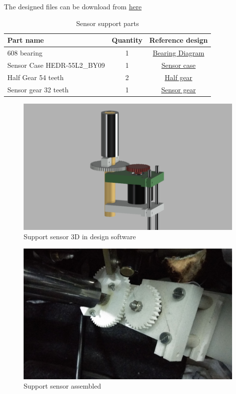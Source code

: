 The designed files can be download from \href{http://a360.co/2D3xN33}{here}

\begin{table}[!hb]
    \centering
	\begin{tabular}{lcc}
		\toprule
		\textbf{Part name} & \textbf{Quantity} & \textbf{Reference design}\\
		\midrule
		608 bearing & 1 & \hyperref[draw:bearing]{Bearing Diagram}\\
		Sensor Case HEDR-55L2\_BY09 & 1 & \hyperref[draw:sensor-case]{Sensor case}\\
        Half Gear 54 teeth & 2 & \hyperref[draw:half-gear]{Half gear}\\
        Sensor gear 32 teeth & 1 & \hyperref[draw:sensor-gear]{Sensor gear}\\
		\bottomrule
	\end{tabular}
\caption{Sensor support parts}
\label{tab:sensor_support_parts}
\end{table}

\begin{figure}[!h]
	\centering
	\includegraphics[width=0.6\linewidth]{figures/support_3D}
	\caption{Support sensor 3D in design software}
	\label{fig:support_sensor_3D}
\end{figure}
\begin{figure}[!h]
	\centering
	\includegraphics[width=0.6\linewidth]{figures/support_real}
	\caption{Support sensor assembled}
	\label{fig:support_sensor_real}
\end{figure}

